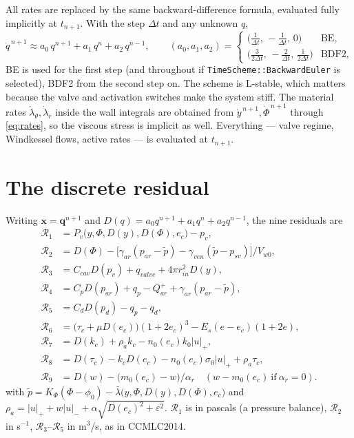 \documentclass[11pt,a4paper]{article}
\newcommand{\rin}{r_{in}}
\newcommand{\lt}{\lambda_\theta}
\newcommand{\lr}{\lambda_r}
\newcommand{\lb}{\bar\lambda}
\newcommand{\pf}{\tilde p}
\newcommand{\Vw}{V_{w0}}
\newcommand{\code}[1]{\texttt{#1}}
\begin{document}
All rates are replaced by the same backward-difference formula, evaluated fully implicitly at $t_{n+1}$. With the step $\Delta t$ and any unknown $q$,
\begin{equation}
\dot q^{\,n+1}\approx a_0\,q^{n+1}+a_1\,q^{n}+a_2\,q^{n-1},\qquad
(a_0,a_1,a_2)=\begin{cases}
\big(\tfrac1{\Delta t},\,-\tfrac1{\Delta t},\,0\big) & \text{BE},\\[3pt]
\big(\tfrac{3}{2\Delta t},\,-\tfrac{2}{\Delta t},\,\tfrac{1}{2\Delta t}\big) & \text{BDF2},
\end{cases}
\end{equation}
BE is used for the first step (and throughout if \code{TimeScheme::BackwardEuler} is selected), BDF2 from the second step on. The scheme is L-stable, which matters because the valve and activation switches make the system stiff. The material rates $\dot\lt,\dot\lr$ inside the wall integrals are obtained from $\dot y^{\,n+1},\dot\Phi^{\,n+1}$ through \eqref{eq:rates}, so the viscous stress is implicit as well. Everything --- valve regime, Windkessel flows, active rates --- is evaluated at $t_{n+1}$.

\section{The discrete residual}

Writing $\mathbf x=\mathbf q^{n+1}$ and $D(q)=a_0q^{n+1}+a_1q^n+a_2q^{n-1}$, the nine residuals are
\begin{align}
\mathcal R_1&=P_v\big(y,\Phi,D(y),D(\Phi),e_c\big)-p_v, \\
\mathcal R_2&=D(\Phi)-\big[\gamma_{ar}(p_{ar}-\pf)-\gamma_{ven}(\pf-p_{sv})\big]/\Vw,\\
\mathcal R_3&=C_{cav}D(p_v)+q_{valve}+4\pi\rin^2D(y),\\
\mathcal R_4&=C_pD(p_{ar})+q_p-Q_{ar}^++\gamma_{ar}(p_{ar}-\pf),\\
\mathcal R_5&=C_dD(p_d)-q_p-q_d,\\
\mathcal R_6&=\big(\tau_c+\mu D(e_c)\big)(1+2e_c)^3-E_s(e-e_c)(1+2e),\\
\mathcal R_7&=D(k_c)+\rho_a k_c-n_0(e_c)k_0|u|_+,\\
\mathcal R_8&=D(\tau_c)-k_cD(e_c)-n_0(e_c)\sigma_0|u|_++\rho_a\tau_c,\\
\mathcal R_9&=D(w)-\big(m_0(e_c)-w\big)/\alpha_r\quad(w-m_0(e_c)\ \text{if}\ \alpha_r=0).
\end{align}
with $\pf=K_\Phi(\Phi-\phi_0)-\lb\big(y,\Phi,D(y),D(\Phi),e_c\big)$ and $\rho_a=|u|_++w|u|_-+\alpha\sqrt{D(e_c)^2+\varepsilon^2}$. $\mathcal R_1$ is in pascals (a pressure balance), $\mathcal R_2$ in s$^{-1}$, $\mathcal R_3$--$\mathcal R_5$ in m$^3$/s, as in CCMLC2014.
\end{document}

